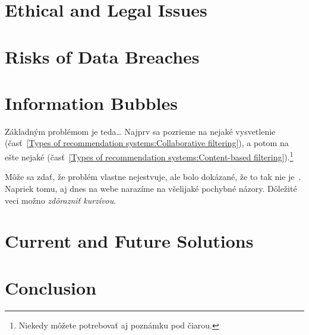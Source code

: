 \documentclass[10pt,twoside,slovak,a4paper]{article}
\begin{document}
\section{Ethical and Legal Issues} \label{Ethical and Legal Issues}

\section{Risks of Data Breaches} \label{Risks of Data Breaches}

\section{Information Bubbles} \label{Information Bubbles}

Základným problémom je teda\ldots{} Najprv sa pozrieme na nejaké vysvetlenie (časť~\ref{Types of recommendation systems:Collaborative filtering}), a potom na ešte nejaké (časť~\ref{Types of recommendation systems:Content-based filtering}).\footnote{Niekedy môžete potrebovať aj poznámku pod čiarou.}

Môže sa zdať, že problém vlastne nejestvuje\cite{Coplien:MPD}, ale bolo dokázané, že to tak nie je~\cite{Czarnecki:Staged, Czarnecki:Progress}. Napriek tomu, aj dnes na webe narazíme na všelijaké pochybné názory\cite{PLP-Framework}. Dôležité veci možno \emph{zdôrazniť kurzívou}.

\section{Current and Future Solutions} \label{Current and Future Solutions}

\section{Conclusion} \label{Conclusion}





\end{document}
